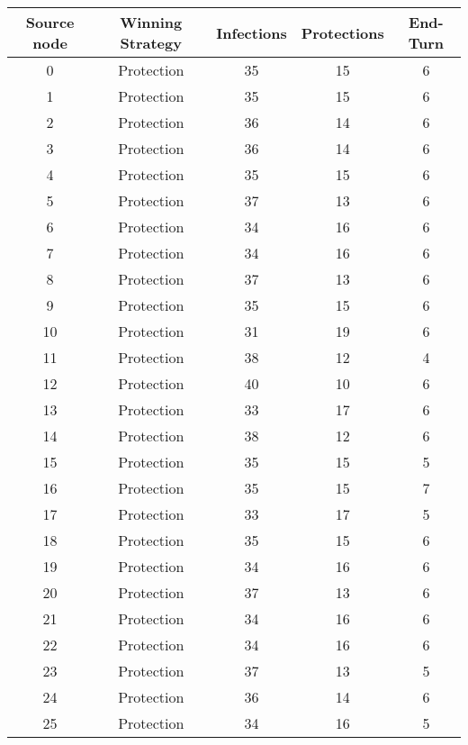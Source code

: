 \documentclass[results.tex]{subfiles}
\begin{document}
\begin{center}
  \begin{tabular}{| c || c | c | c | c |}
    \hline
    {\bfseries Source node} & {\bfseries Winning Strategy} & {\bfseries Infections} & {\bfseries Protections} & {\bfseries End-Turn} \\  %
    \hline\hline
    0 & Protection & 35 & 15 & 6 \\ 
    \hline
    1 & Protection & 35 & 15 & 6 \\ 
    \hline
    2 & Protection & 36 & 14 & 6 \\ 
    \hline
    3 & Protection & 36 & 14 & 6 \\ 
    \hline
    4 & Protection & 35 & 15 & 6 \\ 
    \hline
    5 & Protection & 37 & 13 & 6 \\ 
    \hline
    6 & Protection & 34 & 16 & 6 \\ 
    \hline
    7 & Protection & 34 & 16 & 6 \\ 
    \hline
    8 & Protection & 37 & 13 & 6 \\ 
    \hline
    9 & Protection & 35 & 15 & 6 \\ 
    \hline
    10 & Protection & 31 & 19 & 6 \\ 
    \hline
    11 & Protection & 38 & 12 & 4 \\ 
    \hline
    12 & Protection & 40 & 10 & 6 \\ 
    \hline
    13 & Protection & 33 & 17 & 6 \\ 
    \hline
    14 & Protection & 38 & 12 & 6 \\ 
    \hline
    15 & Protection & 35 & 15 & 5 \\ 
    \hline
    16 & Protection & 35 & 15 & 7 \\ 
    \hline
    17 & Protection & 33 & 17 & 5 \\ 
    \hline
    18 & Protection & 35 & 15 & 6 \\ 
    \hline
    19 & Protection & 34 & 16 & 6 \\ 
    \hline
    20 & Protection & 37 & 13 & 6 \\ 
    \hline
    21 & Protection & 34 & 16 & 6 \\ 
    \hline
    22 & Protection & 34 & 16 & 6 \\ 
    \hline
    23 & Protection & 37 & 13 & 5 \\ 
    \hline
    24 & Protection & 36 & 14 & 6 \\ 
    \hline
    25 & Protection & 34 & 16 & 5 \\ 

\end{tabular}
\end{center}
\end{document}
